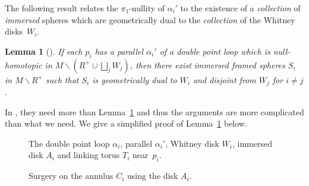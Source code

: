 \documentclass[11pt]{amsart}
\newtheorem{lemma}[theorem]{Lemma}
\theoremstyle{definition}
\theoremstyle{theorem-giventitle}
\theoremstyle{definition-giventitle}
\numberwithin{equation}{section}
\def\setminus{\smallsetminus}
\begin{document}
The following result relates the $\pi_1$-nullity of $\alpha_i'$ to the existence of a \emph{collection} of \emph{immersed} spheres which are geometrically dual to the \emph{collection} of the Whitney disks~$W_i$.

\begin{lemma}[{\cite[Sections 4.2 and 4.7]{Cha-Orr-Powell:2020-1}}]
  \label{lemma:duals-from-accessory-disks}
  If each $p_i$ has a parallel $\alpha_i'$ of a double point loop which is null-homotopic in $M\setminus (R^+ \cup \bigsqcup_j W_j)$, then there exist immersed framed spheres $S_i$ in $M\setminus R^+$ such that $S_i$ is geometrically dual to $W_i$ and disjoint from $W_j$ for $i\ne j$.
\end{lemma}

In \cite[Sections 4.2 and 4.7]{Cha-Orr-Powell:2020-1}, they need more than Lemma~\ref{lemma:duals-from-accessory-disks} and thus the arguments are more complicated than what we need.
We give a simplified proof of Lemma~\ref{lemma:duals-from-accessory-disks} below.

\begin{figure}[t]
  
  \caption{The double point loop $\alpha_i$, parallel $\alpha_i'$, Whitney disk $W_i$, immersed disk $A_i$ and linking torus $T_i$ near~$p_i$.}
  \label{figure:double-point-nbhd}
\end{figure}

\begin{figure}[t]
  
  \caption{Surgery on the annulus $C_i$ using the disk $A_i$.}
  \label{figure:surgery-on-annulus}
\end{figure}
\end{document}

